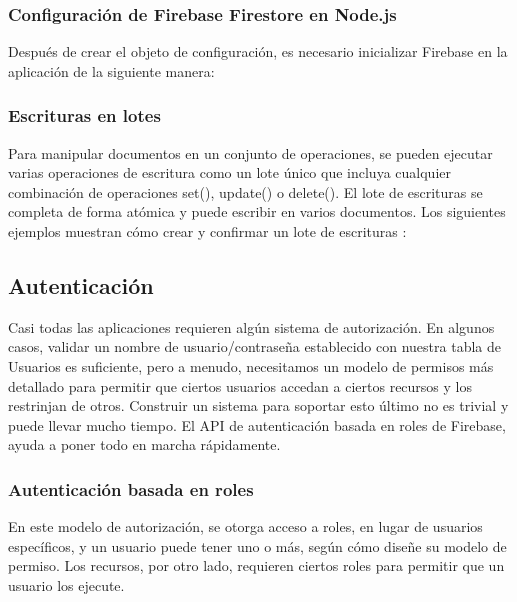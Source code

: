 \newpage
\subsubsection{Configuración de Firebase Firestore en Node.js}
Después de crear el objeto de configuración, es necesario inicializar Firebase en la aplicación de la siguiente manera:
\vspace{0.8cm}



\subsubsection{Escrituras en lotes}
Para manipular documentos en un conjunto de operaciones, se pueden ejecutar varias operaciones de escritura como un lote único que incluya cualquier combinación de operaciones set(), update() o delete(). El lote de escrituras se completa de forma atómica y puede escribir en varios documentos. Los siguientes ejemplos muestran cómo crear y confirmar un lote de escrituras \cite{transactions}:
\vspace{0.8cm}




\subsection{Autenticación}
Casi todas las aplicaciones requieren algún sistema de autorización. En algunos casos, validar un nombre de usuario/contraseña establecido con nuestra tabla de Usuarios es suficiente, pero a menudo, necesitamos un modelo de permisos más detallado para permitir que ciertos usuarios accedan a ciertos recursos y los restrinjan de otros. Construir un sistema para soportar esto último no es trivial y puede llevar mucho tiempo. El API de autenticación basada en roles de Firebase, ayuda a poner todo en marcha rápidamente.

\subsubsection{Autenticación basada en roles}
En este modelo de autorización, se otorga acceso a roles, en lugar de usuarios específicos, y un usuario puede tener uno o más, según cómo diseñe su modelo de permiso. Los recursos, por otro lado, requieren ciertos roles para permitir que un usuario los ejecute.
\vspace{0.8cm}

